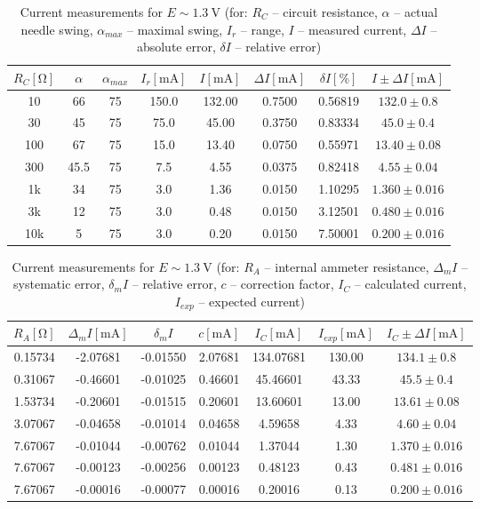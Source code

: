\begin{table}[H]
	\centering
	\begin{tabular}{ c | c | c | c | c | c | c | c }
		$R_C [\unit{\ohm}]$& $\alpha$ & $\alpha_{max}$ & $I_r [\unit{\milli\ampere}]$ & $I [\unit{\milli\ampere}]$ & $\Delta I [\unit{\milli\ampere}]$ & $\delta I [\unit{\percent}]$ & $I \pm \Delta I [\unit{\milli\ampere}]$\\
		\hline
		10  & 66 & 75 & 150.0 & 132.00 & 0.7500 & 0.56819 & $132.0 \pm 0.8$ \\
		30  & 45 & 75 & 75.0 & 45.00 & 0.3750 & 0.83334 & $45.0 \pm 0.4$ \\
		100  & 67 & 75 & 15.0 & 13.40 & 0.0750 & 0.55971 &  $13.40\pm 0.08$\\
		300  & 45.5 & 75 & 7.5 & 4.55 & 0.0375 & 0.82418 & $4.55 \pm 0.04$\\
		1k  & 34 & 75 & 3.0 & 1.36 & 0.0150 & 1.10295 & $1.360\pm 0.016$\\
		3k  & 12 & 75 & 3.0 & 0.48 & 0.0150 & 3.12501 & $0.480\pm 0.016$\\
		10k  & 5 & 75 & 3.0 & 0.20 & 0.0150 & 7.50001 & $0.200\pm 0.016$\\
	\end{tabular}
	\caption{Current measurements for $E\sim\SI{1.3}{\volt}$ (for: $R_C$ -- circuit resistance, $\alpha$ -- actual needle swing, $\alpha_{max}$ -- maximal swing, $I_r$ -- range, $I$ -- measured current, $\Delta I$ --absolute error, $\delta I$ -- relative error)}
	\label{tab:direct_analog_1}
\end{table}

\begin{table}[H]
	\centering
	\begin{tabular}{c | c | c | c | c | c | c}
		$R_A [\unit{\ohm}]$ & $\Delta_m I [\unit{\milli\ampere}]$ & $\delta_m I$ & $c [\unit{\milli\ampere}]$ & $I_C [\unit{\milli\ampere}]$ & $I_{exp} [\unit{\milli\ampere}]$ & $I_C \pm \Delta I [\unit{\milli\ampere}]$\\
		\hline
		0.15734 & -2.07681 & -0.01550 & 2.07681 & 134.07681 &130.00 & $134.1\pm 0.8$\\
		0.31067 & -0.46601 & -0.01025 & 0.46601 & 45.46601 & 43.33 & $45.5\pm 0.4$\\
		1.53734 & -0.20601 & -0.01515 & 0.20601 & 13.60601  & 13.00 & $13.61\pm 0.08$\\
		3.07067 & -0.04658 & -0.01014 & 0.04658 & 4.59658 & 4.33 & $4.60\pm 0.04$\\
		7.67067 & -0.01044 & -0.00762 & 0.01044 & 1.37044 & 1.30 & $1.370\pm 0.016$\\
		7.67067 & -0.00123 & -0.00256 & 0.00123 & 0.48123 & 0.43 & $0.481\pm 0.016$\\
		7.67067 & -0.00016 & -0.00077 & 0.00016 & 0.20016 & 0.13& $0.200\pm 0.016$\\
	\end{tabular}
	\caption{Current measurements for $E\sim\SI{1.3}{\volt}$ (for: $R_A$ -- internal ammeter resistance, $\Delta_m I$ -- systematic error, $\delta_m I$ -- relative error, $c$ -- correction factor, $I_C$ -- calculated current,  $I_{exp}$ -- expected current)}
	\label{tab:direct_analog_2}
\end{table}

